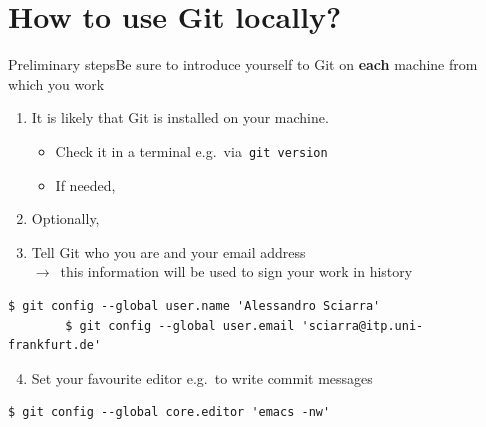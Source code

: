 \documentclass[usenames,svgnames,14pt]{beamer}
\begin{document}
\section{How to use Git locally?}
\begin{frame}[fragile]{Preliminary steps}{Be sure to introduce yourself to Git on \textbf{each} machine from which you work}
    \vspace{-0.02\textheight}
    \begin{enumerate}
        \item It is likely that Git is installed on your machine.
              \begin{itemize}
                  \item Check it in a terminal e.g.\ via \,\texttt{git version}
                  \item If needed, 
              \end{itemize}
        \item Optionally, 
        \item Tell Git who you are and your email address\\
              {\small$\to\,$ this information will be used to sign your work in history}
    \end{enumerate}
    \begin{lstlisting}[style=MyBash, aboveskip=2mm]
        $ git config --global user.name 'Alessandro Sciarra'
        $ git config --global user.email 'sciarra@itp.uni-frankfurt.de'
    \end{lstlisting}
    \begin{enumerate}
        \setcounter{enumi}{3}
        \item Set your favourite editor e.g.\ to write commit messages
    \end{enumerate}
    \begin{lstlisting}[style=MyBash, aboveskip=2mm]
        $ git config --global core.editor 'emacs -nw'
    \end{lstlisting}
\end{frame}
\end{document}
